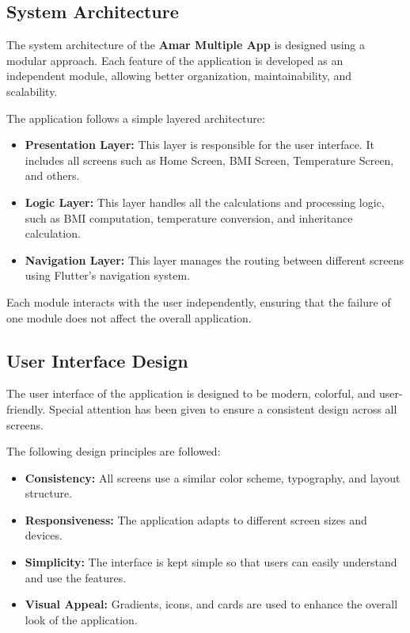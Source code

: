 \documentclass{article}
\begin{document}
\subsection{System Architecture}

The system architecture of the \textbf{Amar Multiple App} is designed using a modular approach. Each feature of the application is developed as an independent module, allowing better organization, maintainability, and scalability.

The application follows a simple layered architecture:

\begin{itemize}
\item \textbf{Presentation Layer:} This layer is responsible for the user interface. It includes all screens such as Home Screen, BMI Screen, Temperature Screen, and others.
\item \textbf{Logic Layer:} This layer handles all the calculations and processing logic, such as BMI computation, temperature conversion, and inheritance calculation.
\item \textbf{Navigation Layer:} This layer manages the routing between different screens using Flutter's navigation system.
\end{itemize}

Each module interacts with the user independently, ensuring that the failure of one module does not affect the overall application.

\subsection{User Interface Design}

The user interface of the application is designed to be modern, colorful, and user-friendly. Special attention has been given to ensure a consistent design across all screens.

The following design principles are followed:

\begin{itemize}
\item \textbf{Consistency:} All screens use a similar color scheme, typography, and layout structure.
\item \textbf{Responsiveness:} The application adapts to different screen sizes and devices.
\item \textbf{Simplicity:} The interface is kept simple so that users can easily understand and use the features.
\item \textbf{Visual Appeal:} Gradients, icons, and cards are used to enhance the overall look of the application.
\end{itemize}
\end{document}
